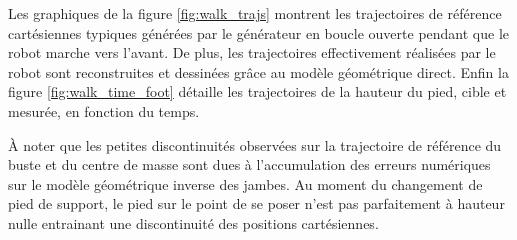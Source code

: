 Les graphiques de la figure \ref{fig:walk_trajs} montrent les trajectoires de référence 
cartésiennes typiques générées par le générateur en boucle
ouverte pendant que le robot marche vers l'avant. 
De plus, les trajectoires effectivement réalisées par 
le robot sont reconstruites et dessinées grâce 
au modèle géométrique direct.
Enfin la figure \ref{fig:walk_time_foot} détaille les 
trajectoires de la hauteur du pied, cible et mesurée, en fonction du temps.

À noter que les petites discontinuités observées sur la trajectoire de référence
du buste et du centre de masse sont dues à l'accumulation des erreurs
numériques sur le modèle géométrique inverse des jambes.
Au moment du changement de pied de support, le pied sur le point de se poser
n'est pas parfaitement à hauteur nulle entrainant une discontinuité 
des positions cartésiennes.

